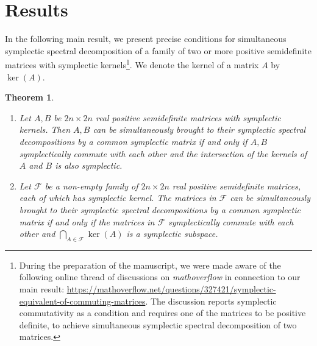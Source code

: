 \documentclass[preprint,12pt]{elsarticle}
\newtheorem{theorem}{Theorem}[section]
\begin{document}
    
\section{Results}
    \label{sec:results}
    In the following main result, we present precise conditions for simultaneous symplectic spectral decomposition of a family of two or more positive semidefinite matrices with symplectic kernels\footnote{During the preparation of the manuscript, we were made aware of the following online thread of discussions on \emph{mathoverflow} in connection to our main result: \url{https://mathoverflow.net/questions/327421/symplectic-equivalent-of-commuting-matrices}. The discussion reports symplectic commutativity as a condition and requires one of the matrices to be positive definite, to achieve simultaneous symplectic spectral decomposition of two matrices.}.
    We denote the kernel of a matrix $A$ by $\operatorname{ker}(A)$.
    {
    \begin{theorem}\label{thm:simul_symp_normal_form}
    \begin{enumerate}
        \item [(a)] Let $A, B$ be $2n \times 2n$ real positive semidefinite matrices with symplectic kernels. 
        Then $A, B$ can be simultaneously brought to their symplectic spectral decompositions by a common symplectic matrix if and only if $A, B$ symplectically commute with each other and the intersection of the kernels of $A$ and $B$ is also symplectic.
        \item [(b)] Let $\mathcal{F}$ be a non-empty family of $2n \times 2n$ real positive semidefinite  matrices, each of which has symplectic kernel. 
        The matrices in $\mathcal{F}$ can be simultaneously brought to their symplectic spectral decompositions by a common symplectic matrix if and only if the matrices in $\mathcal{F}$ symplectically commute with each other and $\bigcap_{A \in \mathcal{F}} \operatorname{ker}(A)$ is a symplectic subspace.
    \end{enumerate}
    
    \end{theorem}
    }
\end{document}

